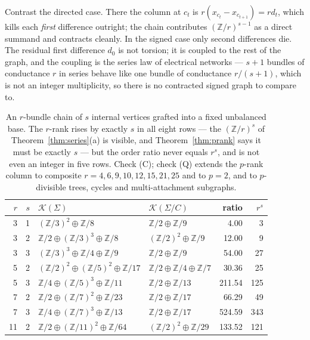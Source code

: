 \documentclass[11pt]{article}
\theoremstyle{plain}
\theoremstyle{definition}
\theoremstyle{remark}
\newcommand{\Z}{\mathbb{Z}}
\newcommand{\K}{\mathcal{K}}
\newcommand{\Sig}{\Sigma}
\begin{document}
Contrast the directed case. There the column at $c_t$ is $r(x_{c_t}-x_{c_{t+1}})=r d_t$,
which kills each \emph{first} difference outright; the chain contributes $(\Z/r)^{s-1}$ as a
direct summand and contracts cleanly. In the signed case only second differences die. The
residual first difference $d_0$ is not torsion; it is coupled to the rest of the graph, and
the coupling is the series law of electrical networks --- $s{+}1$ bundles of conductance $r$
in series behave like one bundle of conductance $r/(s{+}1)$, which is not an integer
multiplicity, so there is no contracted signed graph to compare to.

\begin{table}[t]
\centering
\begin{tabular}{rrllrr}
\toprule
$r$ & $s$ & $\K(\Sig)$ & $\K(\Sig/C)$ & ratio & $r^s$\\
\midrule
 3 & 1 & $(\Z/3)^2\oplus\Z/8$              & $\Z/2\oplus\Z/9$          &   4.00 &   3\\
 3 & 2 & $\Z/2\oplus(\Z/3)^3\oplus\Z/8$    & $(\Z/2)^2\oplus\Z/9$      &  12.00 &   9\\
 3 & 3 & $(\Z/3)^3\oplus\Z/4\oplus\Z/9$    & $\Z/2\oplus\Z/9$          &  54.00 &  27\\
 5 & 2 & $(\Z/2)^2\oplus(\Z/5)^2\oplus\Z/17$ & $\Z/2\oplus\Z/4\oplus\Z/7$ & 30.36 &  25\\
 5 & 3 & $\Z/4\oplus(\Z/5)^3\oplus\Z/11$   & $\Z/2\oplus\Z/13$         & 211.54 & 125\\
 7 & 2 & $\Z/2\oplus(\Z/7)^2\oplus\Z/23$   & $\Z/2\oplus\Z/17$         &  66.29 &  49\\
 7 & 3 & $\Z/4\oplus(\Z/7)^3\oplus\Z/13$   & $\Z/2\oplus\Z/17$         & 524.59 & 343\\
11 & 2 & $\Z/2\oplus(\Z/11)^2\oplus\Z/64$  & $(\Z/2)^2\oplus\Z/29$     & 133.52 & 121\\
\bottomrule
\end{tabular}
\caption{An $r$-bundle chain of $s$ internal vertices grafted into a fixed unbalanced base.
The $r$-rank rises by exactly $s$ in all eight rows --- the $(\Z/r)^s$ of
Theorem~\ref{thm:series}(a) is visible, and Theorem~\ref{thm:prank} says it must be exactly
$s$ --- but the order ratio never equals $r^s$, and is not even an integer in five rows.
Check (C); check (Q) extends the $p$-rank column to composite $r=4,6,9,10,12,15,21,25$ and
to $p=2$, and to $p$-divisible trees, cycles and multi-attachment subgraphs.}
\label{tab:series}
\end{table}
\end{document}

